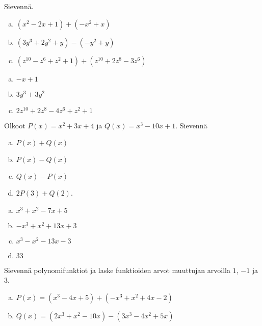 \begin{tehtavasivu}
\begin{tehtava}
    Sievennä.
    \begin{enumerate}[a)]
        \item $(x^2 - 2x + 1) + (-x^2 + x) $
        \item $(3y^3 + 2y^2  + y) - (-y^2 + y)$
        \item $(z^{10} - z^6 + z^2 + 1) + (z^{10} + 2z^8 - 3z^6)$
    \end{enumerate}
    \begin{vastaus}
        \begin{enumerate}[a)]
            \item $-x + 1$
            \item $3y^3 + 3y^2$
            \item $2z^{10} + 2z^8 - 4z^6 + z^2 + 1$
        \end{enumerate}
    \end{vastaus}
\end{tehtava}

\begin{tehtava}
    Olkoot $P(x)=x^2+3x+4$ ja $Q(x)=x^3-10x+1$. Sievennä
    \begin{enumerate}[a)]
        \item $P(x)+Q(x)$
        \item $P(x)-Q(x)$
        \item $Q(x)-P(x)$
        \item $2P(3)+Q(2)$.
    \end{enumerate}
    \begin{vastaus}
        \begin{enumerate}[a)]
            \item $x^3+x^2-7x+5$ %
            \item $-x^3+x^2+13x+3$ %
            \item $x^3-x^2-13x-3$ %
            \item $33$ %
        \end{enumerate}
    \end{vastaus}
\end{tehtava}

\begin{tehtava}
	Sievennä polynomifunktiot ja laske funktioiden arvot muuttujan arvoilla $1$, $-1$ ja $3$.
	\begin{enumerate}[a)]
		\item $P(x)=(x^3-4x+5)+(-x^3+x^2+4x-2)$
		\item $Q(x)=(2x^3+x^2-10x)-(3x^3-4x^2+5x)$
	\end{enumerate}
	

\end{tehtava}
\end{tehtavasivu}
